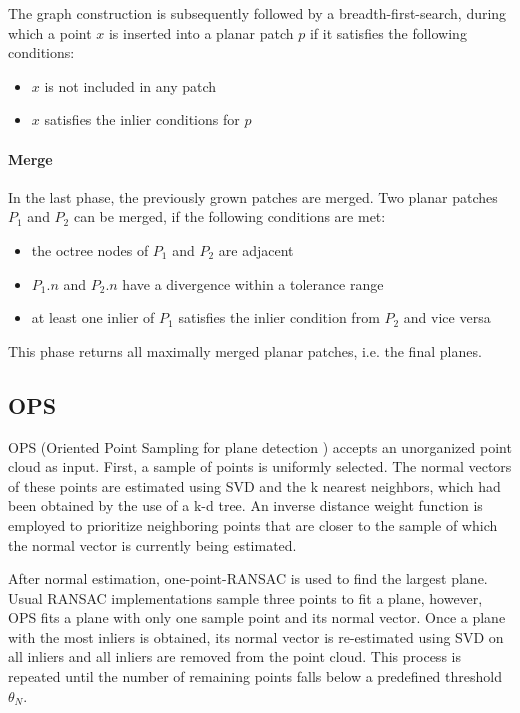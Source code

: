 \documentclass[main.tex]{subfiles}
\begin{document}
The graph construction is subsequently followed by a breadth-first-search, during which a point $x$ is inserted into a planar patch $p$ if it satisfies the following conditions:
\begin{itemize}
    \item $x$ is not included in any patch
    \item $x$ satisfies the inlier conditions for $p$ %
\end{itemize}

\paragraph*{Merge}
In the last phase, the previously grown patches are merged. Two planar patches $P_1$ and $P_2$ can be merged, if the following conditions are met: 
\begin{itemize}
    \item the octree nodes of $P_1$ and $P_2$ are adjacent
    \item $P_1.n$ and $P_2.n$ have a divergence within a tolerance range
    \item at least one inlier of $P_1$ satisfies the inlier condition from $P_2$ and vice versa
\end{itemize}

This phase returns all maximally merged planar patches, i.e. the final planes.

\subsection{OPS}
OPS (Oriented Point Sampling for plane detection \cite{Sun_Mordohai_2019}) accepts an unorganized point cloud as input.
First, a sample of points is uniformly selected. The normal vectors of these points are estimated using SVD and the k nearest neighbors, which had been obtained by the use of a k-d tree.
An inverse distance weight function is employed to prioritize neighboring points that are closer to the sample of which the normal vector is currently being estimated.


After normal estimation, one-point-RANSAC is used to find the largest plane. Usual RANSAC implementations sample three points to fit a plane, however, OPS fits a plane with only one sample point and its normal vector.
Once a plane with the most inliers is obtained, its normal vector is re-estimated using SVD on all inliers and all inliers are removed from the point cloud.
This process is repeated until the number of remaining points falls below a predefined threshold $\theta_N$.
\end{document}
